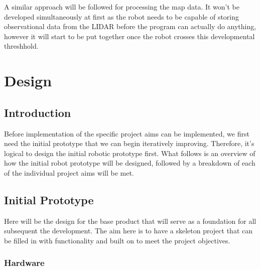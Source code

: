 		A similar approach will be followed for processing the map data. It won't be developed simultaneously at first as the robot needs to be capable of storing observational data from the LIDAR before the program can actually do anything, however it will start to be put together once the robot crosses this developmental threshhold.
	
	\chapter{Design}
		\section{Introduction}
		Before implementation of the specific project aims can be implemented, we first need the initial prototype that we can begin iteratively improving. Therefore, it's logical to design the initial robotic prototype first. What follows is an overview of how the initial robot prototype will be designed, followed by a breakdown of each of the individual project aims will be met.
	
		\section{Initial Prototype}
		Here will be the design for the base product that will serve as a foundation for all subsequent the development. The aim here is to have a skeleton project that can be filled in with functionality and built on to meet the project objectives.
		
			\subsection{Hardware}
